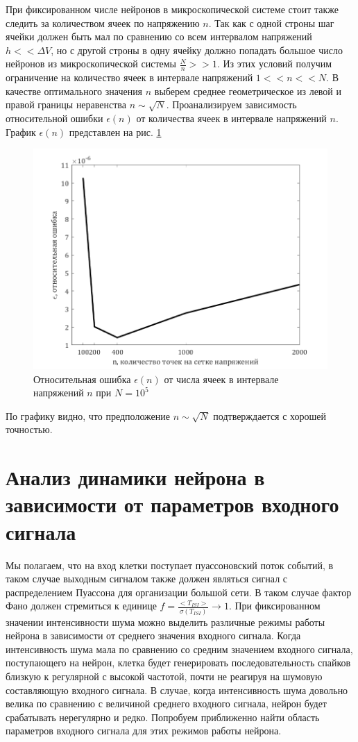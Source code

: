 При фиксированном числе нейронов в микроскопической системе стоит также следить за количеством ячеек по напряжению $n$. Так как с одной строны шаг ячейки должен быть мал по сравнению со всем интервалом напряжений $h<<\Delta V$, но с другой строны в одну ячейку должно попадать большое число нейронов из микроскопической системы $\frac{N}{n}>>1$. Из этих условий получим ограничение на количество ячеек в интервале напряжений $1<<n<<N$. В качестве оптимального значения $n$ выберем среднее геометрическое из левой и правой границы неравенства $n\sim\sqrt{N}$. Проанализируем зависимость относительной ошибки $\epsilon(n)$ от количества ячеек в интервале напряжений $n$. График $\epsilon(n)$ представлен на рис. \ref{pic:5}
\begin{figure}[H]
	\centering
	\includegraphics[width=\linewidth]{pic/epsilon(n).png}
	\caption{Относительная ошибка $\epsilon(n)$ от числа ячеек в интервале напряжений $n$ при $N=10^5$}
	\label{pic:5}
\end{figure}
По графику видно, что предположение $n\sim\sqrt{N}$ подтверждается с хорошей точностью.
\section{Анализ динамики нейрона в зависимости от параметров входного сигнала}
Мы полагаем, что на вход клетки поступает пуассоновский поток событий, в таком случае выходным сигналом также должен являться сигнал с распределением Пуассона для организации большой сети. В таком случае фактор Фано должен стремиться к единице $\displaystyle f=\frac{<T_{ISI}>}{\sigma(T_{ISI})}\to 1$. При фиксированном значении интенсивности шума можно выделить различные режимы работы нейрона в зависимости от среднего значения входного сигнала. Когда интенсивность шума мала по сравнению со средним значением входного сигнала, поступающего на нейрон, клетка будет генерировать последовательность спайков близкую к регулярной с высокой частотой, почти не реагируя на шумовую составляющую входного сигнала. В случае, когда интенсивность шума довольно велика по сравнению с величиной среднего входного сигнала, нейрон будет срабатывать нерегулярно и редко. Попробуем приближенно найти область параметров входного сигнала для этих режимов работы нейрона. 

